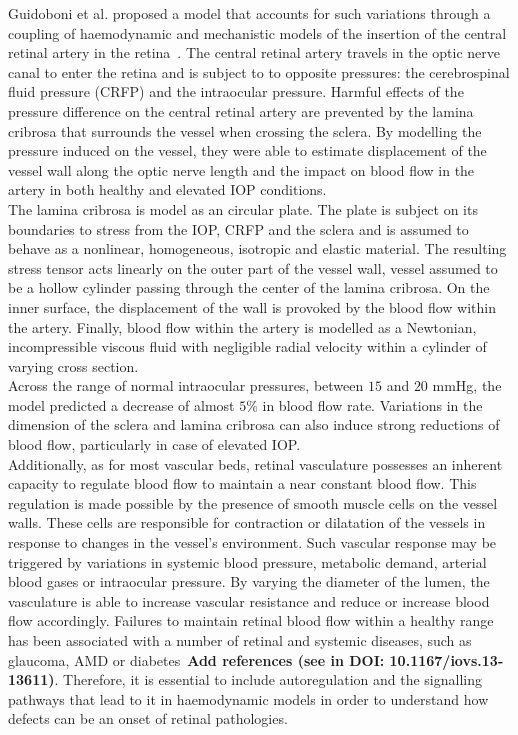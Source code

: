 \documentclass[12pt,a4paper]{article}
\begin{document}
Guidoboni et al. proposed a model that accounts for such variations through a coupling of haemodynamic and mechanistic models of the insertion of the central retinal artery in the retina~\cite{Guidoboni_2014}.
The central retinal artery travels in the optic nerve canal to enter the retina and is subject to to opposite pressures: the cerebrospinal fluid pressure (CRFP) and the intraocular pressure.
Harmful effects of the pressure difference on the central retinal artery are prevented by the lamina cribrosa that surrounds the vessel when crossing the sclera.
By modelling the pressure induced on the vessel, they were able to estimate displacement of the vessel wall along the optic nerve length and the impact on blood flow in the artery in both healthy and elevated IOP conditions.\\
The lamina cribrosa is model as an circular plate.
The plate is subject on its boundaries to stress from the IOP, CRFP and the sclera and is assumed to behave as a nonlinear, homogeneous, isotropic and elastic material.
The resulting stress tensor acts linearly on the outer part of the vessel wall, vessel assumed to be a hollow cylinder passing through the center of the lamina cribrosa.
On the inner surface, the displacement of the wall is provoked by the blood flow within the artery.
Finally, blood flow within the artery is modelled as a Newtonian, incompressible viscous fluid with negligible radial velocity within a cylinder of varying cross section.\\
Across the range of normal intraocular pressures, between $15$ and $20$ mmHg, the model predicted a decrease of almost $5\%$ in blood flow rate.
Variations in the dimension of the sclera and lamina cribrosa can also induce strong reductions of blood flow, particularly in case of elevated IOP. \\


Additionally, as for most vascular beds, retinal vasculature possesses an inherent capacity to regulate blood flow to maintain a near constant blood flow.
This regulation is made possible by the presence of smooth muscle cells on the vessel walls.
These cells are responsible for contraction or dilatation of the vessels in response to changes in the vessel's environment.
Such vascular response may be triggered by variations in systemic blood pressure, metabolic demand, arterial blood gases or intraocular pressure.
By varying the diameter of the lumen, the vasculature is able to increase vascular resistance and reduce or increase blood flow accordingly. 
Failures to maintain retinal blood flow within a healthy range has been associated with a number of retinal and systemic diseases, such as glaucoma, AMD or diabetes~\textbf{Add references (see in DOI: 10.1167/iovs.13-13611)}.
Therefore, it is essential to include autoregulation and the signalling pathways that lead to it in haemodynamic models in order to understand how defects can be an onset of retinal pathologies.\\
\end{document}
